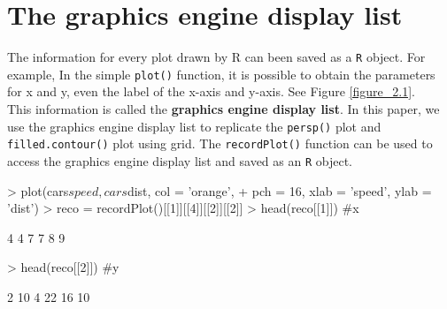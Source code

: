 \documentclass[11pt]{report}
\begin{document}
\chapter{The graphics engine display list}
The information for every plot drawn by R can been saved as a \texttt{R} object. For example, In the simple \texttt{plot()} function, it is possible to obtain the parameters for x and y, even the label of the x-axis and y-axis. See Figure \ref{figure_2.1}.\\

This information is called the \textbf{graphics engine display list}. In this paper, we use the graphics engine display list to replicate the \texttt{persp()} plot and \texttt{filled.contour()} plot using grid. The \texttt{recordPlot()} function can be used to access the graphics engine display list and saved as an \texttt{R} object.

\begin{Schunk}
\begin{Sinput}
> plot(cars$speed, cars$dist, col = 'orange', 
+       pch = 16, xlab = 'speed', ylab = 'dist')
> reco = recordPlot()[[1]][[4]][[2]][[2]]
> head(reco[[1]]) #x
\end{Sinput}
\begin{Soutput}
[1] 4 4 7 7 8 9
\end{Soutput}
\begin{Sinput}
> head(reco[[2]]) #y
\end{Sinput}
\begin{Soutput}
[1]  2 10  4 22 16 10
\end{Soutput}
\end{Schunk}
\end{document}
